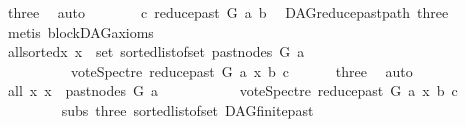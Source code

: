 \begin{isabellebody}
\ three\ \isamarkupfalse%
\ auto\isanewline
\ \ \ \ \isamarkupfalse%
\ \isamarkupfalse%
\ {\isachardoublequoteopen}c\ {\isasymrightarrow}\isactrlsup {\isacharplus}{\kern0pt}\isactrlbsub reduce{\isacharunderscore}{\kern0pt}past\ G\ a\isactrlesub \ b{\isachardoublequoteclose}\ \isamarkupfalse%
\ DAG{\isachardot}{\kern0pt}reduce{\isacharunderscore}{\kern0pt}past{\isacharunderscore}{\kern0pt}path{}\ three\ {}\isanewline
\ \ \ \ \ \ \isamarkupfalse%
\ {\isacharparenleft}{\kern0pt}metis\ blockDAG{\isachardot}{\kern0pt}axioms{\isacharparenleft}{\kern0pt}{}{\isacharparenright}{\kern0pt}{\isacharparenright}{\kern0pt}\ \isanewline
\ \ \ \ \isamarkupfalse%
\ \isamarkupfalse%
\ allsorted{}{}{\isacharcolon}{\kern0pt}{\isachardoublequoteopen}{\isasymforall}x{\isachardot}{\kern0pt}\ x\ {\isasymin}\ set\ {\isacharparenleft}{\kern0pt}sorted{\isacharunderscore}{\kern0pt}list{\isacharunderscore}{\kern0pt}of{\isacharunderscore}{\kern0pt}set\ {\isacharparenleft}{\kern0pt}past{\isacharunderscore}{\kern0pt}nodes\ G\ a{\isacharparenright}{\kern0pt}{\isacharparenright}{\kern0pt}\ {\isasymlongrightarrow}\isanewline
\ \ \ \ \ \ \ \ \ \ vote{\isacharunderscore}{\kern0pt}Spectre\ {\isacharparenleft}{\kern0pt}reduce{\isacharunderscore}{\kern0pt}past\ G\ a{\isacharparenright}{\kern0pt}\ x\ b\ c\ {\isasymin}\ {\isacharbraceleft}{\kern0pt}{}{\isacharcomma}{\kern0pt}\ {}{\isacharbraceright}{\kern0pt}{\isachardoublequoteclose}\ \isamarkupfalse%
\ {}\ three\ \isamarkupfalse%
\ auto\isanewline
\ \ \ \ \isamarkupfalse%
\ \isamarkupfalse%
\ all{}{}{\isacharcolon}{\kern0pt}\ {\isachardoublequoteopen}{\isasymforall}x{\isachardot}{\kern0pt}\ x\ {\isasymin}\ {\isacharparenleft}{\kern0pt}past{\isacharunderscore}{\kern0pt}nodes\ G\ a{\isacharparenright}{\kern0pt}\ {\isasymlongrightarrow}\isanewline
\ \ \ \ \ \ \ \ \ \ vote{\isacharunderscore}{\kern0pt}Spectre\ {\isacharparenleft}{\kern0pt}reduce{\isacharunderscore}{\kern0pt}past\ G\ a{\isacharparenright}{\kern0pt}\ x\ b\ c\ {\isasymin}\ {\isacharbraceleft}{\kern0pt}{}{\isacharcomma}{\kern0pt}\ {}{\isacharbraceright}{\kern0pt}{\isachardoublequoteclose}\isanewline
\ \ \ \ \ \ \isamarkupfalse%
\ \ subs{\isacharparenleft}{\kern0pt}{}{\isacharparenright}{\kern0pt}\ three\ sorted{\isacharunderscore}{\kern0pt}list{\isacharunderscore}{\kern0pt}of{\isacharunderscore}{\kern0pt}set{\isacharparenleft}{\kern0pt}{}{\isacharparenright}{\kern0pt}\ DAG{\isachardot}{\kern0pt}finite{\isacharunderscore}{\kern0pt}past\isanewline

\end{isabellebody}
